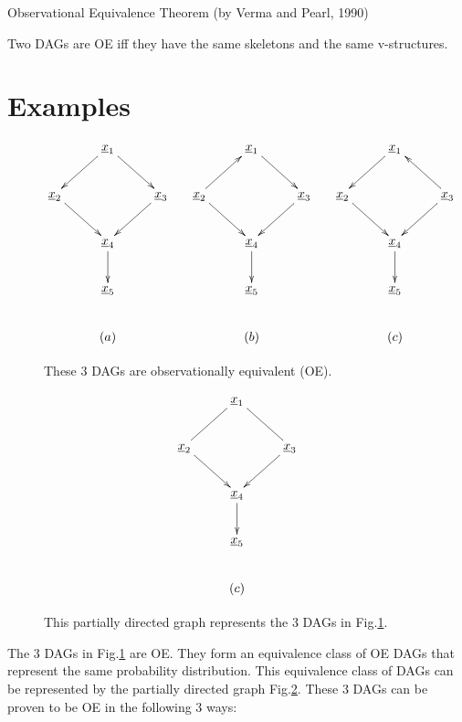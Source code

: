 \begin{claim}Observational Equivalence
Theorem (by Verma and Pearl, 1990)

Two DAGs are
OE
iff they
have the same
skeletons and
the same v-structures.
\end{claim}

\section{Examples}

\begin{figure}[h!]
$$\xymatrix{
&\rvx_1
\ar[dl]
\ar[dr]
\\
\rvx_2\ar[dr]
&&\rvx_3\ar[dl]
\\
&\rvx_4\ar[d]
\\
&\rvx_5
\\
&(a)
}
\;\;\;\;\;
\xymatrix{
&\rvx_1
\ar[dr]
\\
\rvx_2\ar[dr]\ar[ur]
&&\rvx_3\ar[dl]
\\
&\rvx_4\ar[d]
\\
&\rvx_5
\\
&(b)
}
\;\;\;\;\;
\xymatrix{
&\rvx_1
\ar[dl]
\\
\rvx_2\ar[dr]
&&\rvx_3\ar[dl]\ar[ul]
\\
&\rvx_4\ar[d]
\\
&\rvx_5
\\
&(c)
}$$
\caption{These 3 DAGs are 
observationally equivalent (OE).}
\label{fig-obs-equi-eg}
\end{figure}
\begin{figure}[h!]
$$
\xymatrix{
&\rvx_1
\ar@{-}[dl]\ar@{-}[dr]
\\
\rvx_2\ar[dr]
&&\rvx_3\ar[dl]
\\
&\rvx_4\ar[d]
\\
&\rvx_5
\\
&(c)
}$$
\caption{This partially
directed graph 
represents the 3 
DAGs
in Fig.\ref{fig-obs-equi-eg}.}
\label{fig-pdag1}
\end{figure}

The 3 DAGs
in Fig.\ref{fig-obs-equi-eg}
are OE. They form an equivalence
class of OE DAGs
that represent
the same probability distribution.
This
equivalence
class of DAGs
can be represented
by the partially 
directed graph 
Fig.\ref{fig-pdag1}.
These 3 DAGs 
can be proven to 
be OE
in the following 3 ways:


